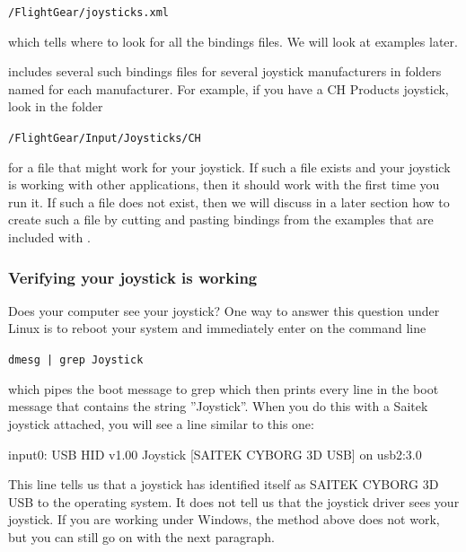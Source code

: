      	\texttt{/FlightGear/joysticks.xml} 
\medskip

\noindent
which tells \FlightGear{} where to look for all the bindings files.  We will
look at examples later.

\FlightGear{} includes several such bindings files for several joystick
manufacturers in folders named for each manufacturer.  For example, if you
have a CH Products joystick, look in the folder
\medskip

    \texttt{/FlightGear/Input/Joysticks/CH}
    \medskip
    
\noindent
for a file that might work for your joystick.  If such a file exists and
your joystick is working with other applications, then it should work with
\FlightGear{} the first time you run it.  If such a file does not exist,
then we will discuss in a later section how to create such a file by cutting
and pasting bindings from the examples that are included with \FlightGear{}.

\subsubsection{Verifying your joystick is working\label{verrifying}}
Does your computer see your joystick?  One way to answer this question under Linux is to reboot your system and immediately enter on the command line
\medskip

	\texttt{dmesg | grep Joystick}
\medskip

\noindent
which pipes the boot message to grep which then prints every line in the
boot message that contains the string ''Joystick''.  When you do this with a
Saitek joystick attached, you will see a line similar to this one:
\medskip

\begin{ttfamily}
\noindent
   input0: USB HID v1.00 Joystick [SAITEK CYBORG 3D USB] on usb2:3.0
\end{ttfamily}
\medskip

\noindent
This line tells us that a joystick has identified itself as SAITEK CYBORG 3D USB to the operating system.  It does not tell us that the joystick driver sees your joystick. If you are working under Windows, the method above does not work, but you can still go on with the next paragraph.

